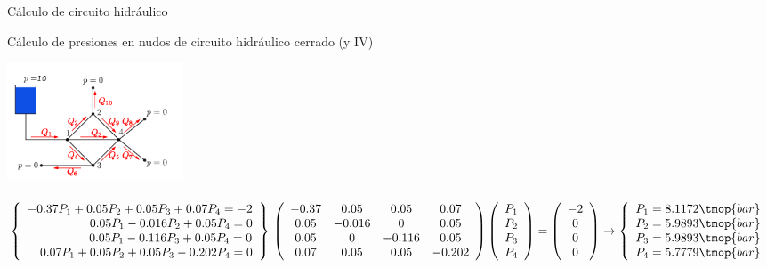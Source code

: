 \documentclass [8pt] {beamer}
\begin{document}
        \begin{frame}{Cálculo de circuito hidráulico}
            \begin{exampleblock}{Cálculo de presiones en nudos de circuito hidráulico cerrado (y IV)}
                \begin{center}
                    {\includegraphics[height=3.5cm]{hidraulic.png}} \\ \ \\
                    {$\left\{ \begin{array}{r}
                    - 0.37 P_1 + 0.05 P_2 + 0.05 P_3 + 0.07 P_4 = - 2\\
                    0.05 P_1 - 0.016 P_2 + 0.05 P_4 = 0\\
                    0.05 P_1 - 0.116 P_3 + 0.05 P_4 = 0_{}\\
                    0.07 P_1 + 0.05 P_2 + 0.05 P_3 - 0.202 P_4 = 0
                    \end{array} \right\} \\ \ \\ \ \\ \left( \begin{array}{cccc}
                    - 0.37 & 0.05 & 0.05 & 0.07\\
                    0.05 & - 0.016 & 0 & 0.05\\
                    0.05 & 0 & - 0.116 & 0.05\\
                    0.07 & 0.05 & 0.05 & - 0.202
                    \end{array} \right) \left( \begin{array}{l}
                    P_1\\  P_2\\  P_3\\  P_4
                    \end{array} \right) = \left( \begin{array}{c}
                    - 2\\  0\\  0\\  0
                    \end{array} \right) \rightarrow \left\{ \begin{array}{l}
                    P_1 = 8.1172 \tmop{bar}\\
                    P_2 = 5.9893 \tmop{bar}\\
                    P_3 = 5.9893 \tmop{bar}\\
                    P_4 = 5.7779 \tmop{bar}
                    \end{array} \right.$}
                \end{center}
            \end{exampleblock}
        \end{frame}
\end{document}
